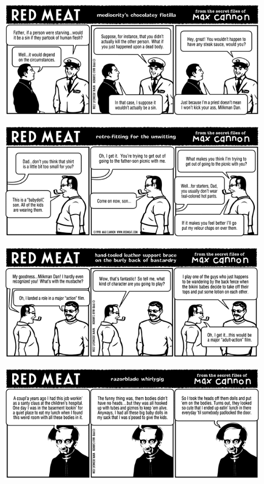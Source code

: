\documentclass[a4paper,twoside,11pt]{article}
\begin{document}
\includegraphics[width=\textwidth]{redmeat_1999-02-15.png}



\includegraphics[width=\textwidth]{redmeat_1999-02-22.png}



\includegraphics[width=\textwidth]{redmeat_1999-03-01.png}



\includegraphics[width=\textwidth]{redmeat_1999-03-08.png}
\end{document}
